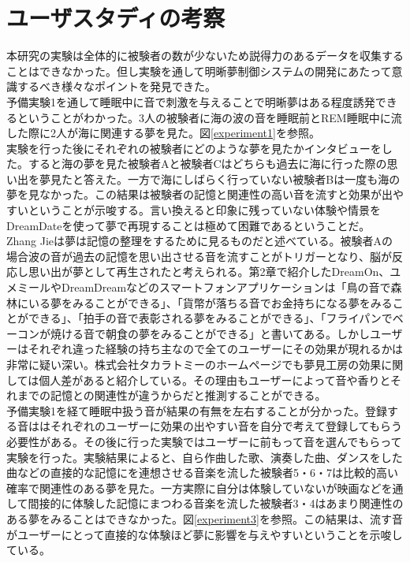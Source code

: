 \section{ユーザスタディの考察}

本研究の実験は全体的に被験者の数が少ないため説得力のあるデータを収集することはできなかった。但し実験を通して明晰夢制御システムの開発にあたって意識するべき様々なポイントを発見できた。\\

予備実験1を通して睡眠中に音で刺激を与えることで明晰夢はある程度誘発できるということがわかった。3人の被験者に海の波の音を睡眠前とREM睡眠中に流した際に2人が海に関連する夢を見た。図\ref{experiment1}を参照。\\

実験を行った後にそれぞれの被験者にどのような夢を見たかインタビューをした。すると海の夢を見た被験者Aと被験者Cはどちらも過去に海に行った際の思い出を夢見たと答えた。一方で海にしばらく行っていない被験者Bは一度も海の夢を見なかった。この結果は被験者の記憶と関連性の高い音を流すと効果が出やすいということが示唆する。言い換えると印象に残っていない体験や情景をDreamDateを使って夢で再現することは極めて困難であるということだ。\\

Zhang Jieは夢は記憶の整理をするために見るものだと述べている\cite{Zhang}。被験者Aの場合波の音が過去の記憶を思い出させる音を流すことがトリガーとなり、脳が反応し思い出が夢として再生されたと考えられる。第2章で紹介したDreamOn、ユメミールやDreamDreamなどのスマートフォンアプリケーションは「鳥の音で森林にいる夢をみることができる」、「貨幣が落ちる音でお金持ちになる夢をみることができる」、「拍手の音で表彰される夢をみることができる」、「フライパンでベーコンが焼ける音で朝食の夢をみることができる」と書いてある。しかしユーザーはそれぞれ違った経験の持ち主なので全てのユーザーにその効果が現れるかは非常に疑い深い。株式会社タカラトミーのホームページでも夢見工房の効果に関しては個人差があると紹介している。その理由もユーザーによって音や香りとそれまでの記憶との関連性が違うからだと推測することができる。\\

予備実験1を経て睡眠中扱う音が結果の有無を左右することが分かった。登録する音ははそれぞれのユーザーに効果の出やすい音を自分で考えて登録してもらう必要性がある。その後に行った実験ではユーザーに前もって音を選んでもらって実験を行った。実験結果によると、自ら作曲した歌、演奏した曲、ダンスをした曲などの直接的な記憶にを連想させる音楽を流した被験者5・6・7は比較的高い確率で関連性のある夢を見た。一方実際に自分は体験していないが映画などを通して間接的に体験した記憶にまつわる音楽を流した被験者3・4はあまり関連性のある夢をみることはできなかった。図\ref{experiment3}を参照。この結果は、流す音がユーザーにとって直接的な体験ほど夢に影響を与えやすいということを示唆している。\\

